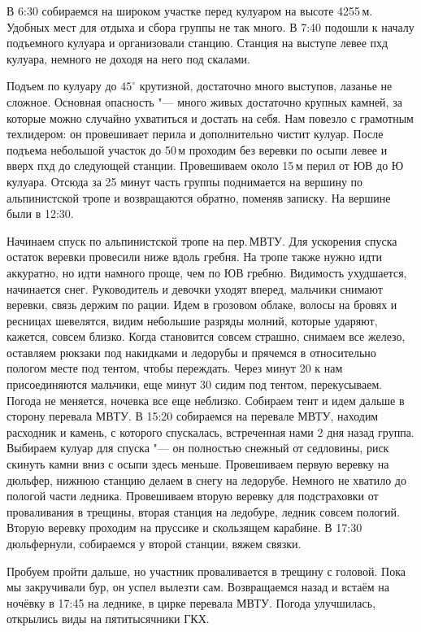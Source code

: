     В 6:30 собираемся на широком участке перед кулуаром на высоте 4255\,м. Удобных мест для отдыха и сбора группы не
    так много. В 7:40 подошли к началу подъемного кулуара и организовали станцию. Станция на выступе левее пхд
    кулуара, немного не доходя на него под скалами.

    Подъем по кулуару до $45^\circ$ крутизной, достаточно много выступов, лазанье не сложное. Основная опасность "---
    много живых достаточно крупных камней, за которые можно случайно ухватиться и достать на себя. Нам повезло с
    грамотным техлидером: он провешивает перила и дополнительно чистит кулуар. После подъема небольшой участок до
    50\,м проходим без веревки по осыпи левее и вверх пхд до следующей станции. Провешиваем около 15\,м перил от
    ЮВ до Ю кулуара. Отсюда за 25 минут часть группы поднимается на вершину по альпинистской тропе и возвращаются
    обратно, поменяв записку. На вершине были в 12:30.

    Начинаем спуск по альпинистской тропе на пер.\,МВТУ. Для ускорения спуска остаток веревки провесили ниже вдоль
    гребня. На тропе также нужно идти аккуратно, но идти намного проще, чем по ЮВ гребню. Видимость ухудшается,
    начинается снег. Руководитель и девочки уходят вперед, мальчики снимают веревки, связь держим по рации. Идем
    в грозовом облаке, волосы на бровях и ресницах шевелятся, видим небольшие разряды молний, которые ударяют,
    кажется, совсем близко. Когда становится совсем страшно, снимаем все железо, оставляем рюкзаки под накидками
    и ледорубы и прячемся в относительно пологом месте под тентом, чтобы переждать. Через минут 20 к нам присоединяются
    мальчики, еще минут 30 сидим под тентом, перекусываем. Погода не меняется, ночевка все еще неблизко. Собираем тент
    и идем дальше в сторону перевала МВТУ. В 15:20 собираемся на перевале МВТУ, находим расходник и камень, с которого
    спускалась, встреченная нами 2 дня назад группа. Выбираем кулуар для спуска "--- он полностью снежный от седловины,
    риск скинуть камни вниз с осыпи здесь меньше. Провешиваем первую веревку на дюльфер, нижнюю станцию делаем в снегу
    на ледорубе. Немного не хватило до пологой части ледника. Провешиваем вторую веревку для подстраховки от
    проваливания в трещины, вторая станция на ледобуре, ледник совсем пологий. Вторую веревку проходим на пруссике
    и скользящем карабине. В 17:30 дюльфернули, собираемся у второй станции, вяжем связки.

    Пробуем пройти дальше, но участник проваливается в трещину с головой. Пока мы закручивали бур, он успел
    вылезти сам. Возвращаемся назад и встаём на ночёвку в 17:45 на леднике, в цирке перевала МВТУ. Погода
    улучшилась, открылись виды на пятитысячники ГКХ.

